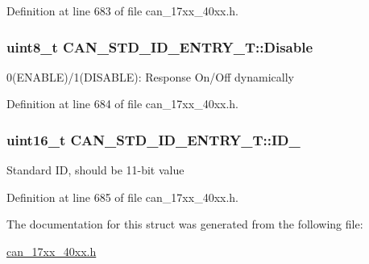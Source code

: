 Definition at line 683 of file can\+\_\+17xx\+\_\+40xx.\+h.

\subsubsection[{\texorpdfstring{Disable}{Disable}}]{\setlength{\rightskip}{0pt plus 5cm}uint8\+\_\+t C\+A\+N\+\_\+\+S\+T\+D\+\_\+\+I\+D\+\_\+\+E\+N\+T\+R\+Y\+\_\+\+T\+::\+Disable}\hypertarget{structCAN__STD__ID__ENTRY__T_a02dc64b0ae7683331953979d1ed9dce7}{}\label{structCAN__STD__ID__ENTRY__T_a02dc64b0ae7683331953979d1ed9dce7}
0(E\+N\+A\+B\+LE)/1(D\+I\+S\+A\+B\+LE)\+: Response On/\+Off dynamically 

Definition at line 684 of file can\+\_\+17xx\+\_\+40xx.\+h.

\subsubsection[{\texorpdfstring{I\+D\+\_\+11}{ID_11}}]{\setlength{\rightskip}{0pt plus 5cm}uint16\+\_\+t C\+A\+N\+\_\+\+S\+T\+D\+\_\+\+I\+D\+\_\+\+E\+N\+T\+R\+Y\+\_\+\+T\+::\+I\+D\+\_}\hypertarget{structCAN__STD__ID__ENTRY__T_a7cb55fad6132fbd461a568ff724f9ca1}{}\label{structCAN__STD__ID__ENTRY__T_a7cb55fad6132fbd461a568ff724f9ca1}
Standard ID, should be 11-\/bit value 

Definition at line 685 of file can\+\_\+17xx\+\_\+40xx.\+h.



The documentation for this struct was generated from the following file\+:\begin{DoxyCompactItemize}
\item 
\hyperlink{can__17xx__40xx_8h}{can\+\_\+17xx\+\_\+40xx.\+h}\end{DoxyCompactItemize}
